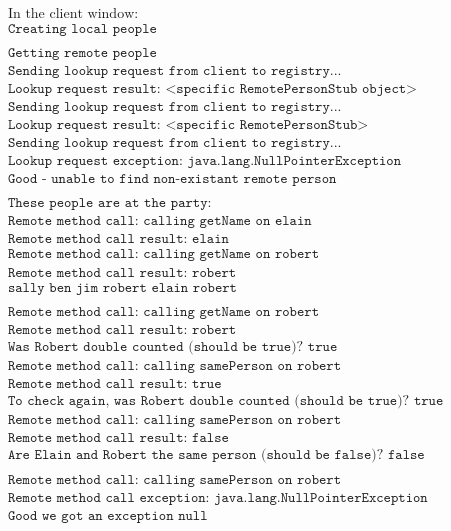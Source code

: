 \documentclass[12pt]{article}
\begin{document}
\begin{align*}
	&\text{In the client window:} \\
	&\texttt{Creating local people} \\ \\
	&\texttt{Getting remote people} \\
	&\texttt{Sending lookup request from client to registry...} \\
	&\texttt{Lookup request result: <specific RemotePersonStub object>} \\
	&\texttt{Sending lookup request from client to registry...} \\
	&\texttt{Lookup request result: <specific RemotePersonStub>} \\
	&\texttt{Sending lookup request from client to registry...} \\
	&\texttt{Lookup request exception: java.lang.NullPointerException} \\
	&\texttt{Good - unable to find non-existant remote person} \\ \\
	&\texttt{These people are at the party:} \\
	&\texttt{Remote method call: calling getName on elain} \\
	&\texttt{Remote method call result: elain} \\
	&\texttt{Remote method call: calling getName on robert} \\
	&\texttt{Remote method call result: robert} \\
	&\texttt{sally ben jim robert elain robert} \\ \\
	&\texttt{Remote method call: calling getName on robert} \\
	&\texttt{Remote method call result: robert} \\
	&\texttt{Was Robert double counted (should be true)? true} \\
	&\texttt{Remote method call: calling samePerson on robert} \\
	&\texttt{Remote method call result: true} \\
	&\texttt{To check again, was Robert double counted (should be true)? true} \\
	&\texttt{Remote method call: calling samePerson on robert} \\
	&\texttt{Remote method call result: false} \\
	&\texttt{Are Elain and Robert the same person (should be false)? false} \\ \\
	&\texttt{Remote method call: calling samePerson on robert} \\
	&\texttt{Remote method call exception: java.lang.NullPointerException} \\
	&\texttt{Good we got an exception null}
\end{align*}
\end{document}
